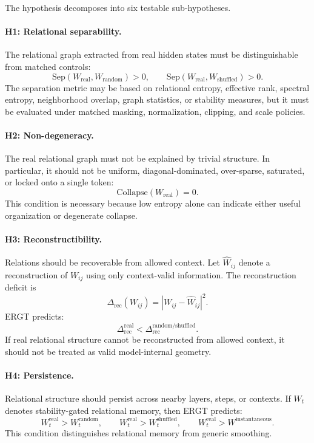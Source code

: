 \documentclass[11pt]{article}
\begin{document}
The hypothesis decomposes into six testable sub-hypotheses.

\paragraph{H1: Relational separability.}
The relational graph extracted from real hidden states must be distinguishable from matched controls:
\[
\mathrm{Sep}(W_{\mathrm{real}},W_{\mathrm{random}})>0,
\qquad
\mathrm{Sep}(W_{\mathrm{real}},W_{\mathrm{shuffled}})>0.
\]
The separation metric may be based on relational entropy, effective rank, spectral entropy, neighborhood overlap, graph statistics, or stability measures, but it must be evaluated under matched masking, normalization, clipping, and scale policies.

\paragraph{H2: Non-degeneracy.}
The real relational graph must not be explained by trivial structure. In particular, it should not be uniform, diagonal-dominated, over-sparse, saturated, or locked onto a single token:
\[
\mathrm{Collapse}(W_{\mathrm{real}})=0.
\]
This condition is necessary because low entropy alone can indicate either useful organization or degenerate collapse.

\paragraph{H3: Reconstructibility.}
Relations should be recoverable from allowed context. Let $\widehat{W}_{ij}$ denote a reconstruction of $W_{ij}$ using only context-valid information. The reconstruction deficit is
\[
\Delta_{\mathrm{rec}}(W_{ij})
=
|W_{ij}-\widehat{W}_{ij}|^2.
\]
ERGT predicts:
\[
\Delta_{\mathrm{rec}}^{\mathrm{real}}
<
\Delta_{\mathrm{rec}}^{\mathrm{random/shuffled}}.
\]
If real relational structure cannot be reconstructed from allowed context, it should not be treated as valid model-internal geometry.

\paragraph{H4: Persistence.}
Relational structure should persist across nearby layers, steps, or contexts. If $W_t$ denotes stability-gated relational memory, then ERGT predicts:
\[
W_t^{\mathrm{real}}
>
W_t^{\mathrm{random}},
\qquad
W_t^{\mathrm{real}}
>
W_t^{\mathrm{shuffled}},
\qquad
W_t^{\mathrm{real}}
>
W^{\mathrm{instantaneous}}.
\]
This condition distinguishes relational memory from generic smoothing.
\end{document}
